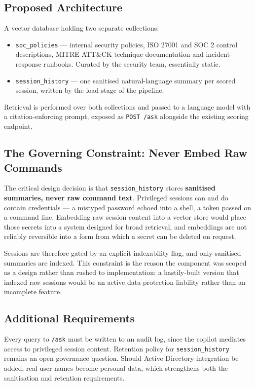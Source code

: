 \documentclass{classeENS}
\begin{document}
\subsection{Proposed Architecture}
A vector database holding two separate collections:

\begin{itemize}
    \item \texttt{soc\_policies} --- internal security policies, ISO 27001 and SOC 2 control descriptions, MITRE ATT\&CK technique documentation and incident-response runbooks. Curated by the security team, essentially static.
    \item \texttt{session\_history} --- one sanitised natural-language summary per scored session, written by the load stage of the pipeline.
\end{itemize}

Retrieval is performed over both collections and passed to a language model with a citation-enforcing prompt, exposed as \texttt{POST /ask} alongside the existing scoring endpoint.

\subsection{The Governing Constraint: Never Embed Raw Commands}
The critical design decision is that \texttt{session\_history} stores \textbf{sanitised summaries, never raw command text}. Privileged sessions can and do contain credentials --- a mistyped password echoed into a shell, a token passed on a command line. Embedding raw session content into a vector store would place those secrets into a system designed for broad retrieval, and embeddings are not reliably reversible into a form from which a secret can be deleted on request.

Sessions are therefore gated by an explicit indexability flag, and only sanitised summaries are indexed. This constraint is the reason the component was scoped as a design rather than rushed to implementation: a hastily-built version that indexed raw sessions would be an active data-protection liability rather than an incomplete feature.

\subsection{Additional Requirements}
Every query to \texttt{/ask} must be written to an audit log, since the copilot mediates access to privileged session content. Retention policy for \texttt{session\_history} remains an open governance question. Should Active Directory integration be added, real user names become personal data, which strengthens both the sanitisation and retention requirements.
\end{document}
